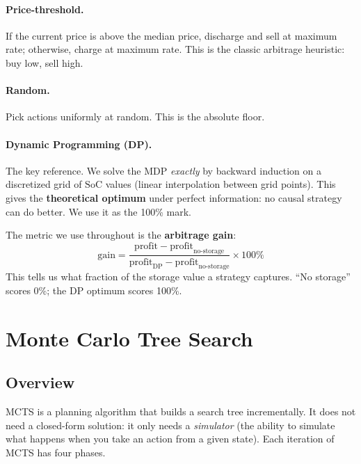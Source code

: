 \documentclass[12pt,a4paper]{article}
\newcommand{\soc}{\mathrm{SoC}}
\begin{document}
\paragraph{Price-threshold.} If the current price is above the median price,
discharge and sell at maximum rate; otherwise, charge at maximum rate. This is
the classic arbitrage heuristic: buy low, sell high.

\paragraph{Random.} Pick actions uniformly at random. This is the absolute
floor.

\paragraph{Dynamic Programming (DP).} The key reference. We solve the MDP
\emph{exactly} by backward induction on a discretized grid of $\soc$ values
(linear interpolation between grid points). This gives the
\textbf{theoretical optimum} under perfect information: no causal strategy can
do better. We use it as the 100\% mark.

\vspace{0.5em}
The metric we use throughout is the \textbf{arbitrage gain}:
\begin{equation}
  \text{gain} = \frac{\text{profit} - \text{profit}_{\text{no-storage}}}
                     {\text{profit}_{\text{DP}} - \text{profit}_{\text{no-storage}}}
                \times 100\%
\end{equation}
This tells us what fraction of the storage value a strategy captures.
``No storage'' scores 0\%; the DP optimum scores 100\%.

\section{Monte Carlo Tree Search}

\subsection{Overview}

MCTS is a planning algorithm that builds a search tree incrementally. It does
not need a closed-form solution: it only needs a \emph{simulator} (the ability
to simulate what happens when you take an action from a given state). Each
iteration of MCTS has four phases.
\end{document}
